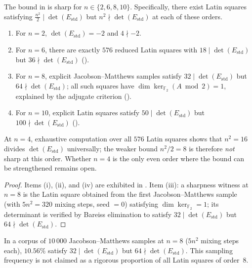 \documentclass[11pt,a4paper]{article}
\newcommand{\FF}{\mathbb{F}}
\newcommand{\Estd}{E_{\mathrm{std}}}
\begin{document}
\begin{proposition}[Sharpness]\label{prop:sharp}
The bound in  is sharp for $n\in\{2,6,8,10\}$.
Specifically, there exist Latin squares satisfying
$\frac{n^2}{2}\mid\det(\Estd)$ but $n^2\nmid\det(\Estd)$ at each
of these orders.
\begin{enumerate}[label=\textup{(\roman*)}]
  \item For $n=2$, $\det(\Estd)=-2$ and $4\nmid -2$.
  \item For $n=6$, there are exactly $576$ reduced Latin squares with
        $18\mid\det(\Estd)$ but $36\nmid\det(\Estd)$
        ().
  \item For $n=8$, explicit Jacobson--Matthews samples satisfy
        $32\mid\det(\Estd)$ but $64\nmid\det(\Estd)$; all such squares
        have $\dim\ker_{\FF_2}(A\bmod 2)=1$, explained by
        the adjugate criterion ().
  \item For $n=10$, explicit Latin squares satisfy
        $50\mid\det(\Estd)$ but $100\nmid\det(\Estd)$
        ().
\end{enumerate}
\end{proposition}

\begin{remark}\label{rem:n4}
  At $n = 4$, exhaustive computation over all $576$ Latin squares shows
  that $n^2 = 16$ divides $\det(\Estd)$ universally; the weaker bound
  $n^2/2 = 8$ is therefore \emph{not} sharp at this order.
  Whether $n = 4$ is the only even order where the bound can be
  strengthened remains open.
\end{remark}

\begin{proof}
Items (i), (ii), and (iv) are exhibited in .
Item (iii): a sharpness witness at $n=8$ is the Latin square
obtained from the first Jacobson--Matthews sample (with $5n^2 = 320$
mixing steps, seed $= 0$) satisfying $\dim\ker_{\FF_2} = 1$; its
determinant is verified by Bareiss elimination to satisfy $32 \mid
\det(\Estd)$ but $64 \nmid \det(\Estd)$.
\end{proof}

\begin{remark}\label{rem:n8-sampling}
In a corpus of $10\,000$ Jacobson--Matthews samples at $n = 8$
($5n^2$ mixing steps each), $10.56\%$ satisfy
$32\mid\det(\Estd)$ but $64\nmid\det(\Estd)$.  This sampling frequency
is not claimed as a rigorous proportion of all Latin squares of order~$8$.
\end{remark}
\end{document}
